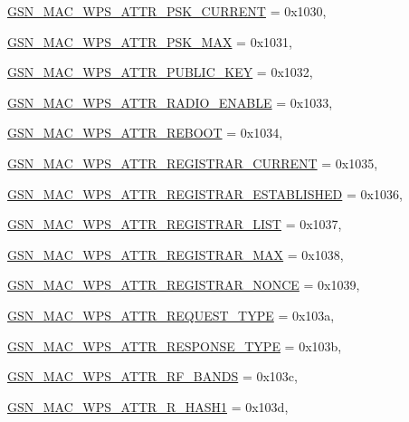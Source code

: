 \begin{DoxyCompactItemize}
\par
\hyperlink{a00642_gga0ae19d69a0b381d883890df8a7812414ab5034f8c8b189c17df7ad8f014598d6e}{GSN\_\-MAC\_\-WPS\_\-ATTR\_\-PSK\_\-CURRENT} =  0x1030, 
\par
\hyperlink{a00642_gga0ae19d69a0b381d883890df8a7812414a58db76da0cc1255ce52bf6f152c2adfa}{GSN\_\-MAC\_\-WPS\_\-ATTR\_\-PSK\_\-MAX} =  0x1031, 
\par
\hyperlink{a00642_gga0ae19d69a0b381d883890df8a7812414a7e34100818d569f2b3ee549b38a2fe30}{GSN\_\-MAC\_\-WPS\_\-ATTR\_\-PUBLIC\_\-KEY} =  0x1032, 
\par
\hyperlink{a00642_gga0ae19d69a0b381d883890df8a7812414a7503378812e50f11419c9ef2ebf38cb4}{GSN\_\-MAC\_\-WPS\_\-ATTR\_\-RADIO\_\-ENABLE} =  0x1033, 
\par
\hyperlink{a00642_gga0ae19d69a0b381d883890df8a7812414a9e2fa8c3462ef0459ac59b542b30d73b}{GSN\_\-MAC\_\-WPS\_\-ATTR\_\-REBOOT} =  0x1034, 
\par
\hyperlink{a00642_gga0ae19d69a0b381d883890df8a7812414ae57635b08d409f68022e5dd31f2db238}{GSN\_\-MAC\_\-WPS\_\-ATTR\_\-REGISTRAR\_\-CURRENT} =  0x1035, 
\par
\hyperlink{a00642_gga0ae19d69a0b381d883890df8a7812414a5c0f743d2a7e9046503b1a12ef8fdbd1}{GSN\_\-MAC\_\-WPS\_\-ATTR\_\-REGISTRAR\_\-ESTABLISHED} =  0x1036, 
\par
\hyperlink{a00642_gga0ae19d69a0b381d883890df8a7812414a2ef5c33ca0d80654d41a318e2d8bbbb9}{GSN\_\-MAC\_\-WPS\_\-ATTR\_\-REGISTRAR\_\-LIST} =  0x1037, 
\par
\hyperlink{a00642_gga0ae19d69a0b381d883890df8a7812414a12357664da12b1300136c3987b234b9a}{GSN\_\-MAC\_\-WPS\_\-ATTR\_\-REGISTRAR\_\-MAX} =  0x1038, 
\par
\hyperlink{a00642_gga0ae19d69a0b381d883890df8a7812414ac72ed6c2511a4fe61f421fe8b97aa84d}{GSN\_\-MAC\_\-WPS\_\-ATTR\_\-REGISTRAR\_\-NONCE} =  0x1039, 
\par
\hyperlink{a00642_gga0ae19d69a0b381d883890df8a7812414a7976e11cc80f9fedaad827a78937ce43}{GSN\_\-MAC\_\-WPS\_\-ATTR\_\-REQUEST\_\-TYPE} =  0x103a, 
\par
\hyperlink{a00642_gga0ae19d69a0b381d883890df8a7812414afc565ba8593a669a97cec3a7ffd12286}{GSN\_\-MAC\_\-WPS\_\-ATTR\_\-RESPONSE\_\-TYPE} =  0x103b, 
\par
\hyperlink{a00642_gga0ae19d69a0b381d883890df8a7812414a61f9014364e3888a78f4f9e9f03cce18}{GSN\_\-MAC\_\-WPS\_\-ATTR\_\-RF\_\-BANDS} =  0x103c, 
\par
\hyperlink{a00642_gga0ae19d69a0b381d883890df8a7812414a34d93c9b4edc5be7a47a6797ff169a13}{GSN\_\-MAC\_\-WPS\_\-ATTR\_\-R\_\-HASH1} =  0x103d, 

\end{DoxyCompactItemize}
